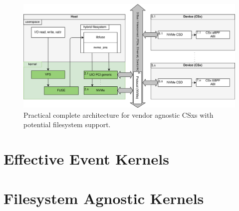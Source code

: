 
\begin{figure}
    \centering
	\includegraphics[width=1\textwidth]{resources/images/loader-pfs-arch-v3.png}
	\caption{Practical complete architecture for vendor agnostic CSxs with
        potential filesystem support.}
    \label{figure:practicalarchitecture}
\end{figure}

\section{Effective Event Kernels}






\section{Filesystem Agnostic Kernels}

